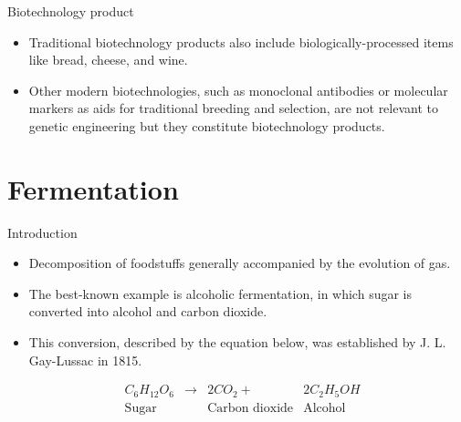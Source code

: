 \documentclass[ignorenonframetext,aspectratio=169]{beamer}
\providecommand{\tightlist}{%
  \setlength{\itemsep}{0pt}\setlength{\parskip}{0pt}}
\begin{document}
\begin{frame}{Biotechnology product}
\protect\hypertarget{biotechnology-product}{}

\begin{itemize}
\tightlist
\item
  Traditional biotechnology products also include biologically-processed
  items like bread, cheese, and wine.
\item
  Other modern biotechnologies, such as monoclonal antibodies or
  molecular markers as aids for traditional breeding and selection, are
  not relevant to genetic engineering but they constitute biotechnology
  products.
\end{itemize}

\end{frame}

\hypertarget{fermentation}{%
\section{Fermentation}\label{fermentation}}

\begin{frame}{Introduction}
\protect\hypertarget{introduction}{}

\begin{itemize}
\tightlist
\item
  Decomposition of foodstuffs generally accompanied by the evolution of
  gas.
\item
  The best-known example is alcoholic fermentation, in which sugar is
  converted into alcohol and carbon dioxide.
\item
  This conversion, described by the equation below, was established by
  J. L. Gay-Lussac in 1815.
\end{itemize}

\[
\begin{aligned}
&C_6 H_{12} O_6 &\rightarrow &2CO_2 + &2C_2H_5OH \\
&\textrm{Sugar} &&\textrm{Carbon dioxide} &\textrm{Alcohol}
\end{aligned}
\]

\end{frame}
\end{document}
